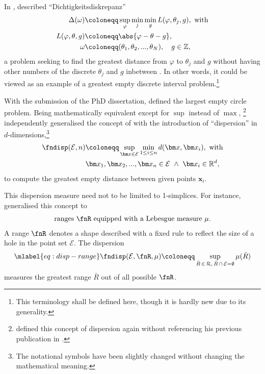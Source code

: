 
In \citeyear{hlawka1976disp}, \citeauthor{hlawka1976disp} described \enquote{Dichtigkeitsdiskrepanz} 
\begin{align*}
  \Delta(\omega) &\coloneqq \sup_{\varphi} \min_{j} \min_{g} L(\varphi, \theta_j, g),\ \text{with}\\
  L(\varphi, \theta, g) &\coloneqq \abs{\varphi - \theta - g},\\
  \omega &\coloneqq (\theta_1, \theta_2, ..., \theta_N),\quad g \in \mathbb Z,
\end{align*}
a problem seeking to find the greatest distance from $\varphi$ to $\theta_j$ and $g$ without having other numbers of the discrete $\theta_j$ and $g$ inbetween . In other words, it could be viewed as an example of a greatest empty discrete interval problem.\footnote{This terminology shall be defined here, though it is hardly new due to its generality.}

With the submission of the PhD dissertation,  defined the largest empty circle problem. Being mathematically equivalent except for $\sup$ instead of $\max$, \footnote{ defined this concept of dispersion again without referencing his previous publication in \citeyear{niederreiter1979disp}.} independently generalised the concept of \citeauthor{hlawka1976disp} with the introduction of \enquote{dispersion} in $d$-dimensions,\footnote{The notational symbols have been slightly changed without changing the mathematical meaning.}
\begin{align*}
  \fndisp(\mathcal E, n) &\coloneqq \sup_{\bm x \in \mathcal E} \min_{1 \leq i \leq n} d(\bm x, \bm x_{i}),\ \text{with}\\
  &\bm x_1, \bm x_2, ..., \bm x_{n} \in \mathcal E\ \wedge\ \bm x_i \in \mathbb R^d,
\end{align*}
to compute the greatest empty distance between given points $\bm x_i$. 

This dispersion measure need not to be limited to 1-simplices. For instance,  generalised this concept to 
\begin{align*}
  \text{ranges $\fnR$ equipped with a Lebesgue measure $\mu$.}
\end{align*}
A range $\fnR$ denotes a shape described with a fixed rule to reflect the size of a hole in the point set $\mathcal E$. The dispersion
\begin{align}\mlabel{eq:disp-range}
  \fndisp(\mathcal E, \fnR, \mu) \coloneqq \sup_{\bar R\,\in\,\mathcal R,\, \bar R\,\cap\,\mathcal E = \emptyset} \mu(\bar R)
\end{align}
measures the greatest range $\bar R$ out of all possible $\fnR$.

